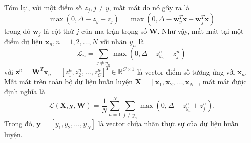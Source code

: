 Tóm lại, với một điểm số $z_j, j \neq y$, mất mát do nó gây ra là
\begin{equation} 
\label{eqn:22_1}
\max(0, \Delta - z_y + z_j) = \max(0, \Delta - \mathbf{w}_y^T\mathbf{x} + \mathbf{w}_j^T\mathbf{x}) 
\end{equation} 
trong đó $\mathbf{w}_j$ là {cột} thứ $j$ của ma trận trọng số $\mathbf{W}$. 
Như vậy, mất mát tại một điểm dữ liệu $\mathbf{x}_n, n = 1, 2, \dots, N$ vỡi nhãn $y_n$ là
\begin{equation*} 
\mathcal{L}_n = \sum_{j \neq y_n} \max(0, \Delta  - z_{y_n}^n + z_j^n) 
\end{equation*} 
với $\mathbf{z}^n = \mathbf{W}^T\mathbf{x}_n = [z^n_1, z^n_2, \dots,
z^n_C]^T \in \mathbb{R}^{C \times 1}$ là vector điểm số tương ứng với $\mathbf{x}_n$.
Mất mát trên toàn bộ dữ liệu huấn luyện $\mathbf{X} = [\mathbf{x}_1, \mathbf{x}_2, \dots,
\mathbf{x}_N ]$, mát mát được định nghĩa là
\begin{equation} 
\label{eqn:22_2}
\mathcal{L}(\mathbf{X}, \mathbf{y}, \mathbf{W}) = \frac{1}{N}\sum_{n=1}^N \sum_{j \neq y_n} \max(0, \Delta - z_{y_n}^n + z_j^n).
\end{equation} 
Trong đó, $\mathbf{y} = [y_1, y_2, \dots, y_N]$ là vector chứa nhãn thực sự
của dữ liệu huấn luyện.
 
 
 
